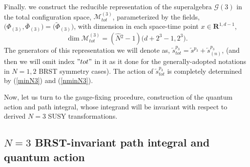 \documentclass[10pt]{article}
\begin{document}
Finally. we construct the reducible representation of the superalgebra $\mathcal{G}(3)$ in the  total configuration space, $\mathcal{M}^{(3)}_{tot}$, parameterized by the fields, $\big({\Phi}_{(3)}, \overline{\Phi}_{(3)}\big) = \big(\widetilde{\Phi}_{(3)}\big)$,  with dimension in each space-time point $x\in \mathbf{R}^{1,d-1}$,
\begin{equation}\label{dimtot}
  \dim \mathcal{M}^{(3)}_{tot} =(\hat{N}{}^2-1) \Big(d +2^3-1,  2^3\Big).
\end{equation}
The generators of this representation we will denote as, $\overleftarrow{s}{}^{p_3}_{tot} = \overleftarrow{s}{}^{p_3} +\overleftarrow{s}{}^{p_3}_{(n)}$, (and then we will omit index $"tot"$ in it as it done  for the generally-adopted  notations in $N=1,2$ BRST symmetry cases).  The action of  $\overleftarrow{s}{}^{p_3}_{tot} $ is completely determined by (\ref{minN3}) and (\ref{nminN3}).

Now, let us turn to the gauge-fixing procedure, construction of the quantum action and path integral, whose integrand will be invariant with respect to derived $N=3$ SUSY transformations.

 \subsection{$N=3$ BRST-invariant path integral and quantum action}\label{N3FPtrickloc}
\end{document}

